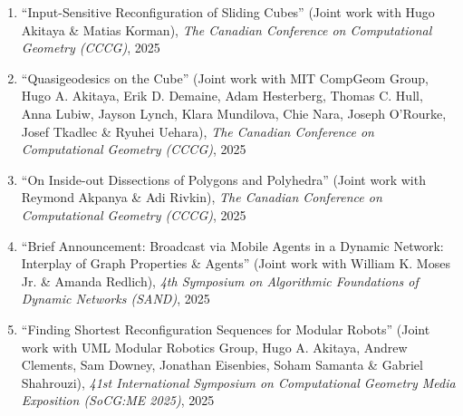 \documentclass[letterpaper,11pt]{article}
\makeatletter
\newcommand{\publication}[6]{
  \item ``#1'' %
   (Joint work with#2), %
     \emph{#3}, %
      #4%


}
\newcommand{\pdficon}{\faFilePdf}
\newcommand{\codeicon}{\faCode}
\newcommand{\doilabel}{\texttt{DOI}}
\makeatother
\begin{document}
    \begin{enumerate}
    \setcounter{enumi}{\value{pubnum}}
      
        \publication
          {Input-Sensitive Reconfiguration of Sliding Cubes}
          {
 Hugo Akitaya \& Matias Korman}
          {The Canadian Conference on Computational Geometry (CCCG)}
          {2025}
          {%
\href{https://arxiv.org/pdf/2507.04170}{\pdficon}%
%
%
          }
          {1}
 \vspace{-.5em}  
      
        \publication
          {Quasigeodesics on the Cube}
          {
 MIT CompGeom Group, Hugo A. Akitaya, Erik D. Demaine, Adam Hesterberg, Thomas C. Hull, Anna Lubiw, Jayson Lynch, Klara Mundilova, Chie Nara, Joseph O'Rourke, Josef Tkadlec \& Ryuhei Uehara}
          {The Canadian Conference on Computational Geometry (CCCG)}
          {2025}
          {%
\href{https://arxiv.org/pdf/2503.10376}{\pdficon}%
%
%
          }
          {2}
 \vspace{-.5em}  
      
        \publication
          {On Inside-out Dissections of Polygons and Polyhedra}
          {
 Reymond Akpanya \& Adi Rivkin}
          {The Canadian Conference on Computational Geometry (CCCG)}
          {2025}
          {%
\href{https://arxiv.org/pdf/2411.06584}{\pdficon}%
%
\quad\href{https://doi.org/10.48550/arXiv.2411.06584}{\doilabel}%
          }
          {3}
 \vspace{-.5em}  
      
        \publication
          {Brief Announcement: Broadcast via Mobile Agents in a Dynamic Network: Interplay of Graph Properties \& Agents}
          {
 William K. Moses Jr. \& Amanda Redlich}
          {4th Symposium on Algorithmic Foundations of Dynamic Networks (SAND)}
          {2025}
          {%
\href{https://drops.dagstuhl.de/entities/document/10.4230/LIPIcs.SAND.2025.17}{\pdficon}%
%
\quad\href{https://doi.org/10.4230/LIPIcs.SAND.2025.17}{\doilabel}%
          }
          {4}
 \vspace{-.5em}  
      
        \publication
          {Finding Shortest Reconfiguration Sequences for Modular Robots}
          {
 UML Modular Robotics Group, Hugo A. Akitaya, Andrew Clements, Sam Downey, Jonathan Eisenbies, Soham Samanta \& Gabriel Shahrouzi}
          {41st International Symposium on Computational Geometry Media Exposition (SoCG:ME 2025)}
          {2025}
          {%
\href{https://drops.dagstuhl.de/storage/00lipics/lipics-vol332-socg2025/LIPIcs.SoCG.2025.85/LIPIcs.SoCG.2025.85.pdf}{\pdficon}%
\quad\href{https://github.com/Modular-Robotics-Group/modular-robotics}{\codeicon}%
\quad\href{https://doi.org/10.4230/LIPIcs.SoCG.2025.85}{\doilabel}%
          }
          {5}
 \vspace{-.5em}  
      

\end{enumerate}
\end{document}
